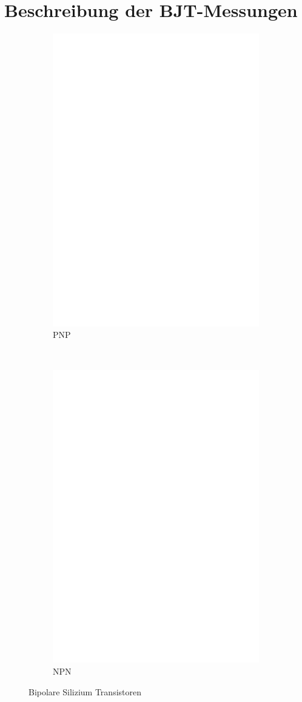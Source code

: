 \chapter{Beschreibung der BJT-Messungen}
\label{sec:BJTmeasurements}

\begin{figure}[H]
  \begin{subfigure}[b]{9cm}
    \centering
    \includegraphics[width=9cm]{../FIG/BJT_BC640.eps}
    \caption{PNP}
    \label{fig:BJT-PNP}
  \end{subfigure}
  ~
  \begin{subfigure}[b]{9cm}
    \centering
    \includegraphics[width=9cm]{../FIG/BJT_BC639.eps}
    \caption{NPN}
    \label{fig:BJT-NPN}
  \end{subfigure}
  \caption{Bipolare Silizium Transistoren}
\end{figure}


